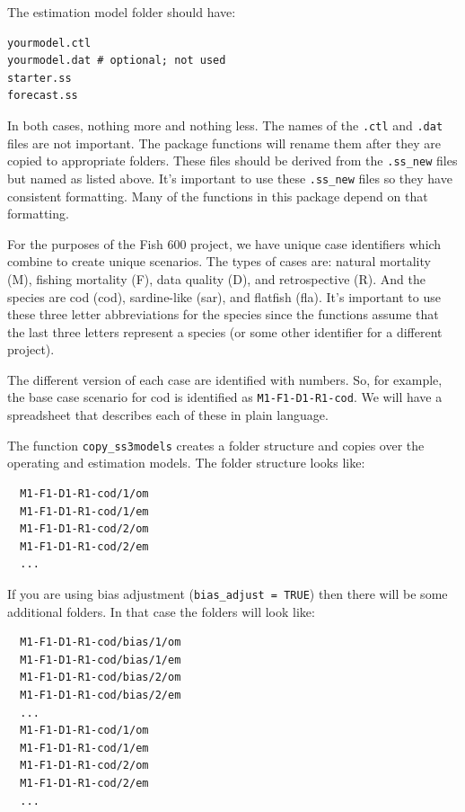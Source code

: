 \documentclass[12pt]{article}
\begin{document}
\noindent
The estimation model folder should have:

\begin{verbatim}
yourmodel.ctl
yourmodel.dat # optional; not used
starter.ss
forecast.ss
\end{verbatim}

\noindent
In both cases, nothing more and nothing less. The names of the \texttt{.ctl} 
and \texttt{.dat} files are not important. The package functions will rename 
them after they are copied to appropriate folders. These files should be 
derived from the \texttt{.ss\_new} files but named as listed above. It's 
important to use these \texttt{.ss\_new} files so they have consistent 
formatting. Many of the functions in this package depend on that formatting.

For the purposes of the Fish 600 project, we have unique case identifiers which 
combine to create unique scenarios. The types of cases are: natural mortality 
(M), fishing mortality (F), data quality (D), and retrospective (R). And the 
species are cod (cod), sardine-like (sar), and flatfish (fla). It's important 
to use these three letter abbreviations for the species since the functions 
assume that the last three letters represent a species (or some other 
identifier for a different project).

The different version of each case are identified with numbers. So, for 
example, the base case scenario for cod is identified as 
\texttt{M1-F1-D1-R1-cod}. We will have a spreadsheet that describes each of 
these in plain language.

The function \texttt{copy\_ss3models} creates a folder structure and copies 
over the operating and estimation models. The folder structure looks like:

\begin{verbatim}
  M1-F1-D1-R1-cod/1/om
  M1-F1-D1-R1-cod/1/em
  M1-F1-D1-R1-cod/2/om
  M1-F1-D1-R1-cod/2/em
  ...
\end{verbatim}

\noindent
If you are using bias adjustment (\texttt{bias\_adjust = TRUE}) then there 
will be some additional folders. In that case the folders will look like:

\begin{verbatim}
  M1-F1-D1-R1-cod/bias/1/om
  M1-F1-D1-R1-cod/bias/1/em
  M1-F1-D1-R1-cod/bias/2/om
  M1-F1-D1-R1-cod/bias/2/em
  ...
  M1-F1-D1-R1-cod/1/om
  M1-F1-D1-R1-cod/1/em
  M1-F1-D1-R1-cod/2/om
  M1-F1-D1-R1-cod/2/em
  ...
\end{verbatim}
\end{document}
